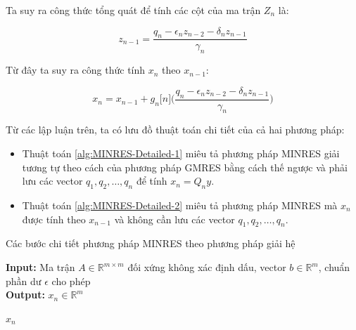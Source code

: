 \documentclass[14pt, a4paper]{article}
\numberwithin{equation}{section}
\numberwithin{algorithm}{section}
\numberwithin{figure}{section}
\numberwithin{dl}{section}
\numberwithin{md}{section}
\numberwithin{bd}{section}
\numberwithin{dn}{section}
\numberwithin{hq}{section}
\begin{document}
Ta suy ra công thức tổng quát để tính các cột của ma trận $Z_n$ là:

\begin{equation}
	z_{n-1} = \dfrac{q_n - \epsilon_n z_{n-2} - \delta_n z_{n-1}}{\gamma_n}
\end{equation}

Từ đây ta suy ra công thức tính $x_n$ theo $x_{n-1}$:

\begin{equation} \label{eq:X-Recurrence}
    x_n = x_{n-1} + g_n\lbrack n \rbrack \Big(\dfrac{q_n - \epsilon_n z_{n-2} - \delta_n z_{n-1}}{\gamma_n}\Big)
\end{equation}

Từ các lập luận trên, ta có lưu đồ thuật toán chi tiết của cả hai phương pháp:

\begin{itemize}
    \item Thuật toán \ref{alg:MINRES-Detailed-1} miêu tả phương pháp MINRES giải tương tự theo cách của phương pháp GMRES bằng cách thế ngược và phải lưu các vector $q_1, q_2, \dots, q_n$ để tính $x_n = Q_n y$.
    \item Thuật toán \ref{alg:MINRES-Detailed-2} miêu tả phương pháp MINRES mà $x_n$ được tính theo $x_{n-1}$ và không cần lưu các vector $q_1, q_2, \dots, q_n$.
\end{itemize}

\begin{algorithm}[h!]
    \caption{Các bước chi tiết phương pháp MINRES theo phương pháp giải hệ}\label{alg:MINRES-Detailed-1}
    \hspace*{\algorithmicindent} \textbf{Input:} {Ma trận $A \in \mathbb{R}^{m \times m}$ đối xứng không xác định dấu, vector $b \in \mathbb{R}^m$, chuẩn phần dư $\epsilon$ cho phép} \\
    \hspace*{\algorithmicindent} \textbf{Output:} {$x_n \in \mathbb{R}^m$}
    \begin{algorithmic}
                \State \Return $x_n$
            \EndIf
        \EndFor
    \end{algorithmic}
\end{algorithm}
\end{document}
